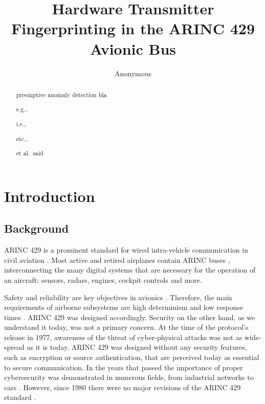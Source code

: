 \documentclass[conference]{IEEEtran}
\title{Hardware Transmitter Fingerprinting in the ARINC 429 Avionic Bus}
\author{Anonymous}
\begin{document}
\maketitle

\begin{abstract}
  preemptive anomaly detection
    bla
    
    e.g., 
    
    i.e.,
    
    etc.,
    
    et al.\ said
    
\end{abstract}


\section{Introduction}
\subsection{Background}
  
  ARINC 429 is a prominent standard for wired intra-vehicle communication in civil aviation \cite{arinc2004arinc429}. Most active and retired airplanes contain ARINC buses \cite{fuchs2012evolution}, interconnecting the many digital systems that are necessary for the operation of an aircraft: sensors, radars, engines, cockpit controls and more.
  
  Safety and reliability are key objectives in avionics \cite{fuchs2012evolution}. Therefore, the main requirements of airborne subsystems are high determinism and low response times \cite{thanthry2005aviation}. ARINC 429 was designed accordingly. Security on the other hand, as we understand it today, was not a primary concern. At the time of the protocol's release in 1977, awareness of the threat of cyber-physical attacks was not as wide-spread as it is today. ARINC 429 was designed without any security features, such as encryption or source authentication, that are perceived today as essential to secure communication. In the years that passed the importance of proper cybersecurity was demonstrated in numerous fields, from industrial networks \cite{langner2011stuxnet} to cars \cite{miller2015remote}. However, since 1980 there were no major revisions of the ARINC 429 standard \cite{18937420070101}.
  
\end{document}
